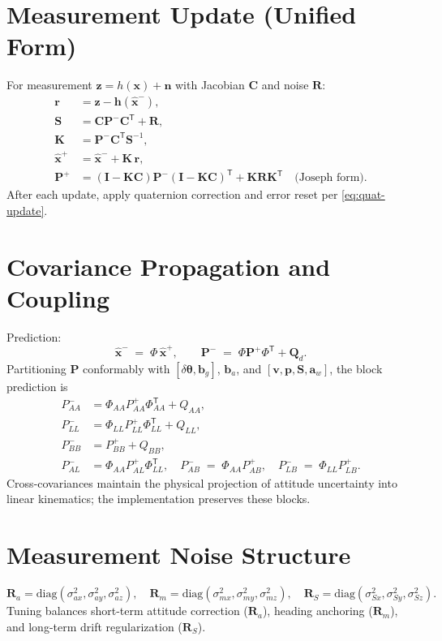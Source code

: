 \documentclass[11pt]{article}
\newcommand{\vect}[1]{\bm{#1}}
\newcommand{\mat}[1]{\bm{#1}}
\newcommand{\T}{\mathsf{T}}
\newcommand{\I}{\mat{I}}
\begin{document}
\section{Measurement Update (Unified Form)}
\label{sec:meas-update}
For measurement \(\vect{z}=h(\vect{x})+\vect{n}\) with Jacobian \(\mat{C}\) and noise \(\mat{R}\):
\begin{align}
 \vect{r} &= \vect{z} - \vect{h}(\hat{\vect{x}}^-), \label{eq:innov}\\
 \mat{S}  &= \mat{C}\mat{P}^- \mat{C}^{\T} + \mat{R}, \label{eq:S}\\
 \mat{K}  &= \mat{P}^- \mat{C}^{\T} \mat{S}^{-1}, \label{eq:K}\\
 \hat{\vect{x}}^+ &= \hat{\vect{x}}^- + \mat{K}\,\vect{r}, \label{eq:x-update}\\
 \mat{P}^+ &= (\I - \mat{K}\mat{C})\mat{P}^- (\I - \mat{K}\mat{C})^{\T} + \mat{K}\mat{R}\mat{K}^{\T} \quad \text{(Joseph form)}.
 \label{eq:joseph}
\end{align}
After each update, apply quaternion correction and error reset per \eqref{eq:quat-update}.

\section{Covariance Propagation and Coupling}
\label{sec:cov-prop}
Prediction:
\begin{equation}
  \hat{\vect{x}}^- \;=\; \Phi\,\hat{\vect{x}}^+,
  \qquad
  \mat{P}^- \;=\; \Phi \mat{P}^+ \Phi^{\T} + \mat{Q}_d.
  \label{eq:pred}
\end{equation}
Partitioning \( \mat{P} \) conformably with \([\delta\vect{\theta},\vect{b}_g]\),
\(\vect{b}_a\), and \([\vect{v},\vect{p},\vect{S},\vect{a}_w]\), the block prediction is
\begin{align}
  P_{AA}^- &= \Phi_{AA} P_{AA}^+ \Phi_{AA}^{\T} + Q_{AA}, \\
  P_{LL}^- &= \Phi_{LL} P_{LL}^+ \Phi_{LL}^{\T} + Q_{LL}, \\
  P_{BB}^- &= P_{BB}^+ + Q_{BB}, \\
  P_{AL}^- &= \Phi_{AA} P_{AL}^+ \Phi_{LL}^{\T}, \quad
  P_{AB}^- \;=\; \Phi_{AA} P_{AB}^+, \quad
  P_{LB}^- \;=\; \Phi_{LL} P_{LB}^+.
  \label{eq:block-prop}
\end{align}
Cross-covariances maintain the physical projection of attitude uncertainty into
linear kinematics; the implementation preserves these blocks.

\section{Measurement Noise Structure}
\label{sec:meas-noise}
\begin{equation}
  \mat{R}_a = \mathrm{diag}(\sigma_{ax}^2,\sigma_{ay}^2,\sigma_{az}^2),\quad
  \mat{R}_m = \mathrm{diag}(\sigma_{mx}^2,\sigma_{my}^2,\sigma_{mz}^2),\quad
  \mat{R}_S = \mathrm{diag}(\sigma_{Sx}^2,\sigma_{Sy}^2,\sigma_{Sz}^2).
  \label{eq:R-blocks}
\end{equation}
Tuning balances short-term attitude correction (\(\mat{R}_a\)), heading anchoring (\(\mat{R}_m\)),
and long-term drift regularization (\(\mat{R}_S\)).
\end{document}
